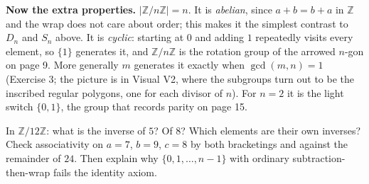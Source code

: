 \documentclass[10pt]{article}
\newcommand{\Z}{\mathbb{Z}}
\begin{document}
{\begin{minipage}[t]{744pt}
\begin{minipage}[t]{362pt}
\begin{why}
\end{why}
\begin{bigpic}
\textbf{Now the extra properties.} $|\Z/n\Z|=n$. It is \emph{abelian}, since $a+b=b+a$ in $\Z$ and the wrap does not care about order; this makes it the simplest contrast to $D_n$ and $S_n$ above. It is \emph{cyclic}: starting at $0$ and adding $1$ repeatedly visits every element, so $\{1\}$ generates it, and $\Z/n\Z$ is the rotation group of the arrowed $n$-gon on page 9. More generally $m$ generates it exactly when $\gcd(m,n)=1$ (Exercise 3; the picture is in Visual V2, where the subgroups turn out to be the inscribed regular polygons, one for each divisor of $n$). For $n=2$ it is the light switch $\{0,1\}$, the group that records parity on page 15.
\end{bigpic}
\begin{tryit}
In $\Z/12\Z$: what is the inverse of $5$? Of $8$? Which elements are their own inverses? Check associativity on $a=7$, $b=9$, $c=8$ by both bracketings and against the remainder of $24$. Then explain why $\{0,1,\dots,n-1\}$ with ordinary subtraction-then-wrap fails the identity axiom.
\end{tryit}
\end{minipage}
\end{minipage}
}
\end{document}
